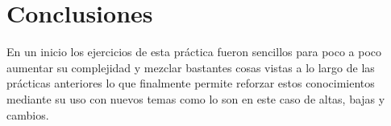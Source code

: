 \documentclass[12pt, titlepage]{article}
\begin{document}
	\section{Conclusiones}
	En un inicio los ejercicios de esta práctica fueron sencillos para poco a poco aumentar su complejidad y mezclar bastantes cosas vistas a lo largo de las prácticas anteriores lo que finalmente permite reforzar estos conocimientos mediante su uso con nuevos temas como lo son en este caso de altas, bajas y cambios.
	 
	
\end{document}
